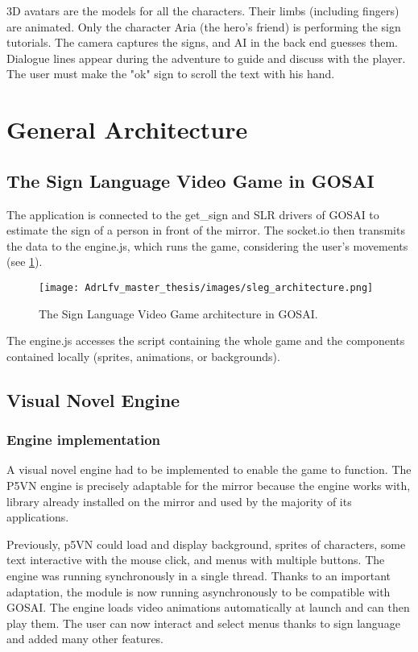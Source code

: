3D avatars are the models for all the characters. Their limbs (including fingers) are animated. Only the character Aria (the hero's friend) is performing the sign tutorials.
The camera captures the signs, and AI in the back end guesses them. Dialogue lines appear during the adventure to guide and discuss with the player. The user must make the "ok" sign to scroll the text with his hand.



\section{General Architecture}

\subsection{The Sign Language Video Game in GOSAI}

The application is connected to the get\_sign and SLR drivers of GOSAI to estimate the sign of a person in front of the mirror. The socket.io then transmits the data to the engine.js, which runs the game, considering the user's movements (see \ref{fig:sleg_architecture}).

\begin{figure}[h]
    \centering
    \texttt{[image: AdrLfv\_master\_thesis/images/sleg\_architecture.png]}
    \caption{The Sign Language Video Game architecture in GOSAI.}
    \label{fig:sleg_architecture}
\end{figure}

The engine.js accesses the script containing the whole game and the components contained locally (sprites, animations, or backgrounds).

\subsection{Visual Novel Engine}

\subsubsection{Engine implementation}

A visual novel engine had to be implemented to enable the game to function. The P5VN engine is precisely adaptable for the mirror because the engine works with, library already installed on the mirror and used by the majority of its applications.

Previously, p5VN could load and display background, sprites of characters, some text interactive with the mouse click, and menus with multiple buttons.
The engine was running synchronously in a single thread.
Thanks to an important adaptation, the module is now running asynchronously to be compatible with GOSAI. 
The engine loads video animations automatically at launch and can then play them. The user can now interact and select menus thanks to sign language and added many other features.

